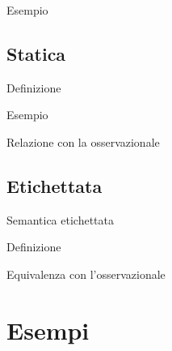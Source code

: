 \documentclass{beamer}
\theoremstyle{plain}
\theoremstyle{definition}
\theoremstyle{remark}
\begin{document}
\begin{frame}{Esempio}
  
\end{frame}

\subsection{Statica}

\begin{frame}{Definizione}
  
\end{frame}

\begin{frame}{Esempio}
  
\end{frame}

\begin{frame}{Relazione con la osservazionale}
  
\end{frame}

\subsection{Etichettata}

\begin{frame}{Semantica etichettata}
  
\end{frame}

\begin{frame}{Definizione}
  
\end{frame}

\begin{frame}{Equivalenza con l'osservazionale}
  
\end{frame}

\section{Esempi}

\begin{frame}
  
\end{frame}
\end{document}
